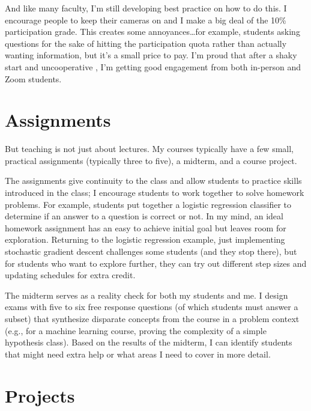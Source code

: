 And like many faculty, I'm still developing best practice on how to do
this.  I encourage people to keep their cameras on and I make a big
deal of the 10\% participation grade.  This creates some
annoyances\dots for example, students asking questions for the sake of
hitting the participation quota rather than actually wanting
information, but it's a small price to pay.  I'm proud that after a
shaky start and uncooperative , I'm getting good engagement
from both in-person and Zoom students.

\section{Assignments}

But teaching is not just about lectures.  My courses typically have a
few small, practical assignments (typically three to five), a midterm,
and a course project.

The assignments give continuity to the class and allow students to
practice skills introduced in the class; I encourage students to work
together to solve homework problems.
%
For example, students put together a logistic regression classifier to
determine if an answer to a question is correct or not.  In my mind,
an ideal homework assignment has an easy to achieve initial goal but
leaves room for exploration.  Returning to the logistic regression
example, just implementing stochastic gradient descent challenges some
students (and they stop there), but for students who want to explore
further, they can try out different step sizes and updating schedules
for extra credit.

The midterm serves as a reality check for both my students and me.  I
design exams with five to six free response questions (of which
students must answer a subset) that synthesize disparate concepts from
the course in a problem context (e.g., for a machine learning course,
proving the  complexity of a simple hypothesis class).  Based
on the results of the midterm, I can identify students that might need
extra help or what areas I need to cover in more detail.

\section{Projects}

